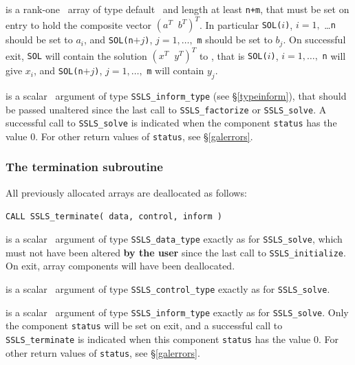 \documentclass{galahad}
\newcommand{\packagename}{SSLS}
\begin{document}
\vspace*{-3mm}
\begin{description}

 is a rank-one  \intentinout\ array of type default \real\
and length at least {\tt n+m}, that must be set on entry to hold
the composite vector $( a^T \;\; b^T)^T$.
In particular {\tt SOL(}$i${\tt )}, $i = 1,$ \ldots {\tt n} should be
set to $a_i$, and
{\tt SOL(n}$+j${\tt )}, $j = 1, \ldots,$ {\tt m} should be
set to $b_j$. On successful exit, {\tt SOL}
will contain the solution $( x^T \;\; y^T)^T$ to , that is
{\tt SOL(}$i${\tt )}, $i = 1, \ldots,$ {\tt n} will give
$x_i$, and {\tt SOL(n}$+j${\tt )}, $j = 1,\ldots,$ {\tt m} will contain
$y_j$.

 is a scalar \intentout\ argument of type
{\tt \packagename\_inform\_type}
(see \S\ref{typeinform}), that should be passed unaltered since
the last call to {\tt \packagename\_factorize} or
{\tt \packagename\_solve}.  A successful call to
{\tt \packagename\_solve}
is indicated when the  component {\tt status} has the value 0.
For other return values of {\tt status}, see \S\ref{galerrors}.

\end{description}


\subsubsection{The  termination subroutine}
All previously allocated arrays are deallocated as follows:
\vspace*{1mm}

\hspace{8mm}
{\tt CALL \packagename\_terminate( data, control, inform )}

\begin{description}

 is a scalar \intentinout\ argument of type
{\tt \packagename\_data\_type}
exactly as for
{\tt \packagename\_solve},
which must not have been altered {\bf by the user} since the last call to
{\tt \packagename\_initialize}.
On exit, array components will have been deallocated.

 is a scalar \intentin\ argument of type
{\tt \packagename\_control\_type}
exactly as for
{\tt \packagename\_solve}.

 is a scalar \intentout\ argument of type
{\tt \packagename\_inform\_type}
exactly as for
{\tt \packagename\_solve}.
Only the component {\tt status} will be set on exit, and a
successful call to
{\tt \packagename\_terminate}
is indicated when this  component {\tt status} has the value 0.
For other return values of {\tt status}, see \S\ref{galerrors}.

\end{description}
\end{document}

